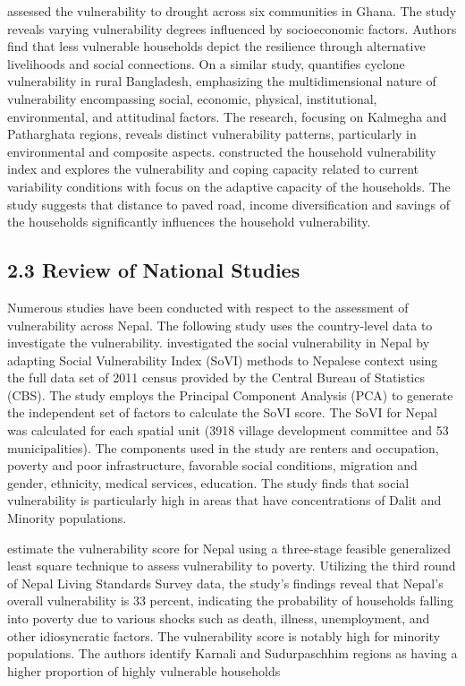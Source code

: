 \documentclass[12pt, a4paper]{article}
\begin{document}
\cite{antwi2013characterising} assessed the vulnerability to drought across six communities in Ghana. The study reveals varying vulnerability degrees influenced by socioeconomic factors. Authors find that less vulnerable households depict the resilience through alternative livelihoods and social connections. On a similar study, \cite{rahman2023households} quantifies cyclone vulnerability in rural Bangladesh, emphasizing  the multidimensional nature of vulnerability encompassing social, economic, physical, institutional, environmental, and attitudinal factors. The research, focusing on Kalmegha and Patharghata regions, reveals distinct vulnerability patterns, particularly in environmental and composite aspects. \cite{notenbaert2013derivation} constructed the household vulnerability index and explores the vulnerability and coping capacity related to current variability conditions with  focus on the adaptive capacity of the households. The study suggests that distance to paved road, income diversification and savings of the households significantly influences the household vulnerability. 

\subsection*{2.3 Review of National Studies}
\renewcommand{\thepage}{\arabic{page}}
Numerous studies have been conducted with respect to the assessment of vulnerability across Nepal. The following study uses the country-level data to investigate the vulnerability. \cite{aksha2019analysis} investigated the social vulnerability in Nepal by adapting Social Vulnerability Index (SoVI) methods to Nepalese context using the full data set of 2011 census provided by the Central Bureau of Statistics (CBS). The study employs the Principal Component Analysis (PCA) to generate the independent set of factors to calculate the SoVI score. The SoVI for Nepal was calculated for each spatial unit (3918 village development committee and 53 municipalities). The components used in the study are renters and occupation, poverty and poor infrastructure, favorable social conditions, migration and gender, ethnicity, medical services, education. The study finds that social vulnerability is particularly high in areas that have concentrations of Dalit and Minority populations.    

\cite{shahiestimating} estimate the vulnerability score for Nepal using a three-stage feasible generalized least square technique to assess vulnerability to poverty. Utilizing the third round of Nepal Living Standards Survey data, the study's findings reveal that Nepal's overall vulnerability is 33 percent, indicating the probability of households falling into poverty due to various shocks such as death, illness, unemployment, and other idiosyncratic factors. The vulnerability score is notably high for minority populations. The authors identify Karnali and Sudurpaschhim regions as having a higher proportion of highly vulnerable households 
\end{document}
